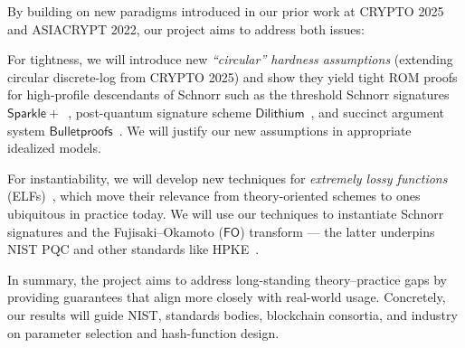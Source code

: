By  building on new paradigms introduced in our prior work at CRYPTO 2025 and ASIACRYPT 2022, our project aims to address both issues:
\begin{newenum}
\item For tightness, we will introduce new \emph{``circular''  hardness assumptions} (extending   circular discrete-log  from CRYPTO 2025) and show they yield tight ROM proofs for high-profile descendants of Schnorr such as the threshold Schnorr signatures $\mathsf{Sparkle+}$~\cite{C:CriKomMal23}, post-quantum signature scheme $\mathsf{Dilithium}$~\cite{Dilithium}, and succinct argument system $\mathsf{Bulletproofs}$~\cite{Bulletproofs}. We will justify our new assumptions in appropriate idealized models.
\item	For instantiability, we will develop new techniques for \emph{extremely lossy functions} (ELFs)~\cite{C:Zhandry16}, which  move their relevance from theory-oriented schemes to ones ubiquitous in practice today. We will  use our techniques  to  instantiate Schnorr signatures and the Fujisaki–Okamoto ($\mathsf{FO}$) transform --- the latter underpins NIST PQC and other standards like  HPKE~\cite{rfc9180}. %
\end{newenum}
In summary, the project aims to address long-standing theory–practice gaps by providing   guarantees that align more closely with real-world usage. Concretely, our results will guide NIST, standards bodies, blockchain consortia, and industry on parameter selection and hash-function design.




